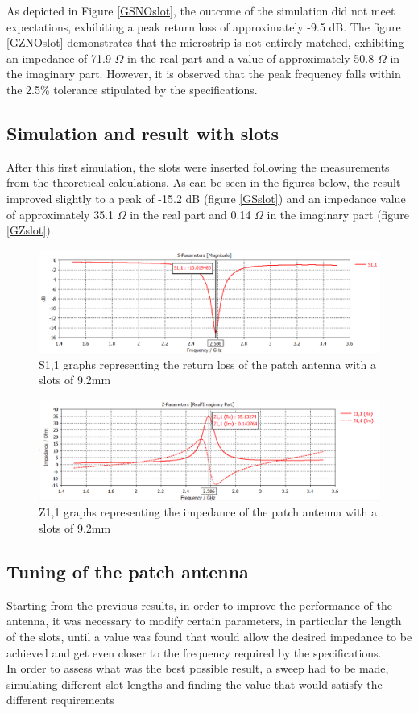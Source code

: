 \documentclass[]{article}
\begin{document}
As depicted in Figure \eqref{GSNOslot}, the outcome of the simulation did not meet expectations, exhibiting a peak return loss of approximately -9.5 dB. The figure \eqref{GZNOslot} demonstrates that the microstrip is not entirely matched, exhibiting an impedance of 71.9 $\Omega$ in the real part and a value of approximately 50.8 $\Omega$ in the imaginary part. However, it is observed that the peak frequency falls within the 2.5\% tolerance stipulated by the specifications.
\subsection{Simulation and result with slots}
After this first simulation, the slots were inserted following the measurements from the theoretical calculations. As can be seen in the figures below, the result improved slightly to a peak of -15.2 dB (figure \eqref{GSslot}) and an impedance value of approximately 35.1 $\Omega$ in the real part and 0.14  $\Omega$  in the imaginary part (figure \eqref{GZslot}).
 \begin{figure}[h]
	\centering
	\includegraphics[width=0.8\linewidth]{img/img5}
	\caption{S1,1 graphs representing the return loss of the patch antenna with a slots of 9.2mm}
	\label{GSslot}
\end{figure}

\begin{figure}[h]
	\centering
	\includegraphics[width=0.8\linewidth]{img/img6}
	\caption{Z1,1 graphs representing the impedance of the patch antenna with a slots of 9.2mm}
	\label{GZslot}
\end{figure}
 \subsection{Tuning of the patch antenna}
 Starting from the previous results, in order to improve the performance of the antenna, it was necessary to modify certain parameters, in particular the length of the slots, until a value was found that would allow the desired impedance to be achieved and get even closer to the frequency required by the specifications.\\
  In order to assess what was the best possible result, a sweep had to be made, simulating different slot lengths and finding the value that would satisfy the different requirements
  
  
\end{document}
